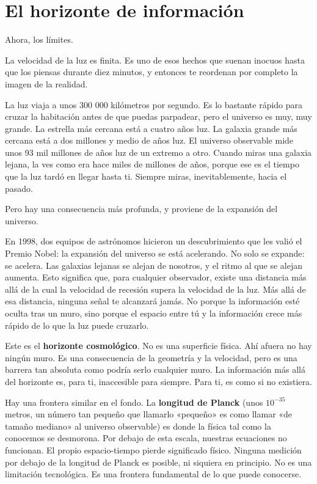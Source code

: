 \documentclass[11pt, twoside, openright]{book}
\begin{document}
\section*{El horizonte de información}

Ahora, los límites.

La velocidad de la luz es finita. Es uno de esos hechos que suenan inocuos hasta que los piensas durante diez minutos, y entonces te reordenan por completo la imagen de la realidad.

La luz viaja a unos 300 000 kilómetros por segundo. Es lo bastante rápido para cruzar la habitación antes de que puedas parpadear, pero el universo es muy, muy grande. La estrella más cercana está a cuatro años luz. La galaxia grande más cercana está a dos millones y medio de años luz. El universo observable mide unos 93 mil millones de años luz de un extremo a otro. Cuando miras una galaxia lejana, la ves como era hace miles de millones de años, porque ese es el tiempo que la luz tardó en llegar hasta ti. Siempre miras, inevitablemente, hacia el pasado.

Pero hay una consecuencia más profunda, y proviene de la expansión del universo.

En 1998, dos equipos de astrónomos hicieron un descubrimiento que les valió el Premio Nobel: la expansión del universo se está acelerando. No solo se expande: se acelera. Las galaxias lejanas se alejan de nosotros, y el ritmo al que se alejan aumenta. Esto significa que, para cualquier observador, existe una distancia más allá de la cual la velocidad de recesión supera la velocidad de la luz. Más allá de esa distancia, ninguna señal te alcanzará jamás. No porque la información esté oculta tras un muro, sino porque el espacio entre tú y la información crece más rápido de lo que la luz puede cruzarlo.

Este es el \textbf{horizonte cosmológico}. No es una superficie física. Ahí afuera no hay ningún muro. Es una consecuencia de la geometría y la velocidad, pero es una barrera tan absoluta como podría serlo cualquier muro. La información más allá del horizonte es, para ti, inaccesible para siempre. Para ti, es como si no existiera.

Hay una frontera similar en el fondo. La \textbf{longitud de Planck} (unos $10^{-35}$ metros, un número tan pequeño que llamarlo «pequeño» es como llamar «de tamaño mediano» al universo observable) es donde la física tal como la conocemos se desmorona. Por debajo de esta escala, nuestras ecuaciones no funcionan. El propio espacio-tiempo pierde significado físico. Ninguna medición por debajo de la longitud de Planck es posible, ni siquiera en principio. No es una limitación tecnológica. Es una frontera fundamental de lo que puede conocerse.
\end{document}
